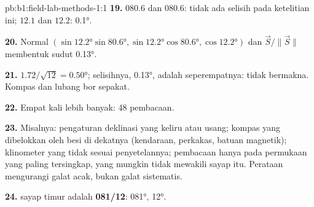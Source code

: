 \begin{solution}{pb:b1:field-lab-methods-1:1}
\textbf{19.}  $080.6$ dan $080.6$: tidak ada selisih pada ketelitian ini;  $12.1$ dan $12.2$: \ang{0.1}.

\textbf{20.} Normal $(\sin\ang{12.2}\sin\ang{80.6},
\sin\ang{12.2}\cos\ang{80.6}, \cos\ang{12.2})$ dan $\vec S/\|\vec S\|$ membentuk sudut \ang{0.13}.

\textbf{21.} $1.72/\sqrt{12} = \ang{0.50}$; selisihnya, \ang{0.13}, adalah seperempatnya: tidak bermakna. Kompas dan lubang bor sepakat.

\textbf{22.} Empat kali lebih banyak: 48 pembacaan.

\textbf{23.} Misalnya: pengaturan deklinasi yang keliru atau usang; kompas yang dibelokkan oleh besi di dekatnya (kendaraan, perkakas, batuan magnetik); klinometer yang tidak sesuai penyetelannya; pembacaan hanya pada permukaan yang paling tersingkap, yang mungkin tidak mewakili sayap itu. Perataan mengurangi galat acak, bukan galat sistematis.

\textbf{24.}  sayap timur adalah \textbf{081/12}:  \ang{081},  \ang{12}.
\end{solution}
